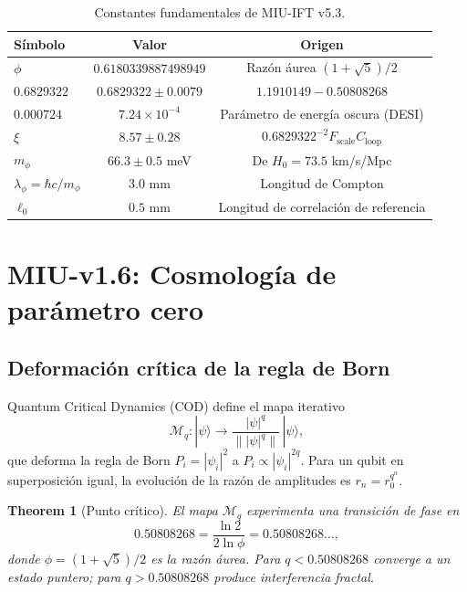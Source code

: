 \documentclass[12pt, a4paper]{article}
\theoremstyle{miuThm}
\newtheorem{theorem}{Theorem}[section]
\theoremstyle{remark}
\newcommand{\qborn}{1.1910149}
\newcommand{\qcrit}{0.50808268}
\newcommand{\DeltaCOD}{0.6829322}
\newcommand{\eps}{0.000724}
\begin{document}
\begin{table}[h!]
\centering
\caption{Constantes fundamentales de MIU-IFT v5.3.}
\label{tab:ctes}
\begin{tabular}{lcc}
\toprule
\textbf{Símbolo} & \textbf{Valor} & \textbf{Origen} \\
\midrule
$\phi$ & $0.6180339887498949$ & Razón áurea $(1+\sqrt5)/2$ \\
$\DeltaCOD$ & $0.6829322 \pm 0.0079$ & $\qborn - \qcrit$ \\
$\eps$ & $7.24\times10^{-4}$ & Parámetro de energía oscura (DESI) \\
$\xi$ & $8.57 \pm 0.28$ & $\DeltaCOD^{-2}F_{\text{scale}}C_{\text{loop}}$ \\
$m_\phi$ & $66.3 \pm 0.5$ meV & De $H_0=73.5$ km/s/Mpc \\
$\lambda_\phi = \hbar c/m_\phi$ & $3.0$ mm & Longitud de Compton \\
$\ell_0$ & $0.5$ mm & Longitud de correlación de referencia \\
\bottomrule
\end{tabular}
\end{table}

\clearpage
\section{MIU-v1.6: Cosmología de parámetro cero}
\label{sec:MIU}

\subsection{Deformación crítica de la regla de Born}
Quantum Critical Dynamics (COD) define el mapa iterativo
\begin{equation}
\mathcal{M}_q: |\psi\rangle \rightarrow \frac{|\psi|^q}{\| |\psi|^q \|} \, |\psi\rangle,
\end{equation}
que deforma la regla de Born $P_i = |\psi_i|^2$ a $P_i \propto |\psi_i|^{2q}$. Para un qubit en superposición igual, la evolución de la razón de amplitudes es $r_n = r_0^{q^n}$.

\begin{theorem}[Punto crítico]
\label{thm:qcrit}
El mapa $\mathcal{M}_q$ experimenta una transición de fase en
\begin{equation}
\qcrit = \frac{\ln 2}{2\ln\phi} = 0.50808268\ldots,
\end{equation}
donde $\phi = (1+\sqrt5)/2$ es la razón áurea. Para $q<\qcrit$ converge a un estado puntero; para $q>\qcrit$ produce interferencia fractal.
\end{theorem}
\end{document}
